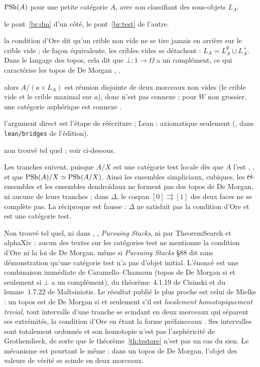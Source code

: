 \begin{trace}
\item[tablier] $\mathrm{PSh}(A)$ pour une petite catégorie $A$, avec son classifiant des sous-objets $L_A$.
\item[arche] le pont~\ref{br:dm} d'un côté, le pont~\ref{br:test} de l'autre.
\item[spécialiser] la condition d'Ore dit qu'un crible non vide ne se tire jamais en arrière sur le crible vide ; de façon équivalente, les cribles vides se détachent : $L_A = L_A^{\emptyset}\sqcup L_A^{+}$. Dans le langage des topos, cela dit que $\bot\colon 1\to\Omega$ a un complément, ce qui caractérise les topos de De Morgan \cite[\S1]{caramello-demorgan}, \cite[prop.~14]{caramello-chamoun}.
\item[réécrire] alors $A/(a\times L_A)$ est réunion disjointe de deux morceaux non vides (le crible vide et le crible maximal sur $a$), donc n'est pas connexe ; pour $W$ non grossier, une catégorie asphérique est connexe \cite[lemme~1.7.22]{maltsiniotis-301}.
\item[vérifier] l'argument direct est l'étape de réécriture ; Lean : axiomatique seulement (, dans \texttt{lean/bridges} de l'édition).
\item[nouveauté] non trouvé tel quel ; voir ci-dessous.
\end{trace}

\noindent Les tranches suivent, puisque $A/X$ est une catégorie test locale dès que $A$ l'est \cite[prop.~4.1.14 (v)]{cisinski-308}, \cite[rem.~1.5.4 b)]{maltsiniotis-301}, et que $\mathrm{PSh}(A)/X\simeq\mathrm{PSh}(A/X)$. Ainsi les ensembles simpliciaux, cubiques, les $\Theta$-ensembles et les ensembles dendroïdaux ne forment pas des topos de De Morgan, ni aucune de leurs tranches ; dans $\Delta$, le cospan $[0]\rightrightarrows[1]$ des deux faces ne se complète pas. La réciproque est fausse : $\Delta$ ne satisfait pas la condition d'Ore et est une catégorie test.

\status{} Non trouvé tel quel, ni dans \cite{cisinski-308}, \cite{maltsiniotis-301}, \emph{Pursuing Stacks}, ni par TheoremSearch et alphaXiv : aucun des textes sur les catégories test ne mentionne la condition d'Ore ni la loi de De Morgan, même si \emph{Pursuing Stacks} \S88 dit sans démonstration qu'une catégorie test n'a pas d'objet initial. L'énoncé est une combinaison immédiate de Caramello--Chamoun (topos de De Morgan si et seulement si $\bot$ a un complément), du théorème~4.1.19 de Cisinski et du lemme~1.7.22 de Maltsiniotis. Le résultat publié le plus proche est celui de Mielke : un topos est de De Morgan si et seulement s'il est \emph{localement homotopiquement trivial}, tout intervalle d'une tranche se scindant en deux morceaux qui séparent ses extrémités, la condition d'Ore en étant la forme préfaisceaux \cite[th.~1.5, cor.~1.6]{mielke}. Ses intervalles sont totalement ordonnés et son homotopie n'est pas l'asphéricité de Grothendieck, de sorte que le théorème~\ref{th:testore} n'est pas un cas du sien. Le mécanisme est pourtant le même : dans un topos de De Morgan, l'objet des valeurs de vérité se scinde en deux morceaux.
